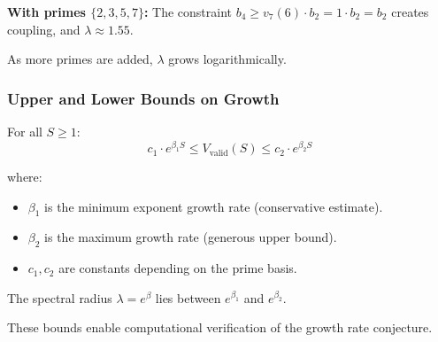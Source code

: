\textbf{With primes $\{2, 3, 5, 7\}$:} The constraint $b_4 \geq v_7(6) \cdot b_2 = 1 \cdot b_2 = b_2$ creates coupling, and $\lambda \approx 1.55$.

As more primes are added, $\lambda$ grows logarithmically.

\subsubsection{Upper and Lower Bounds on Growth}

\begin{proposition}
For all $S \geq 1$:
\begin{equation}
c_1 \cdot e^{\beta_1 S} \leq V_{\text{valid}}(S) \leq c_2 \cdot e^{\beta_2 S}
\end{equation}

where:
\begin{itemize}
\item $\beta_1$ is the minimum exponent growth rate (conservative estimate).
\item $\beta_2$ is the maximum growth rate (generous upper bound).
\item $c_1, c_2$ are constants depending on the prime basis.
\end{itemize}

The spectral radius $\lambda = e^{\beta}$ lies between $e^{\beta_1}$ and $e^{\beta_2}$.
\end{proposition}

These bounds enable computational verification of the growth rate conjecture.
